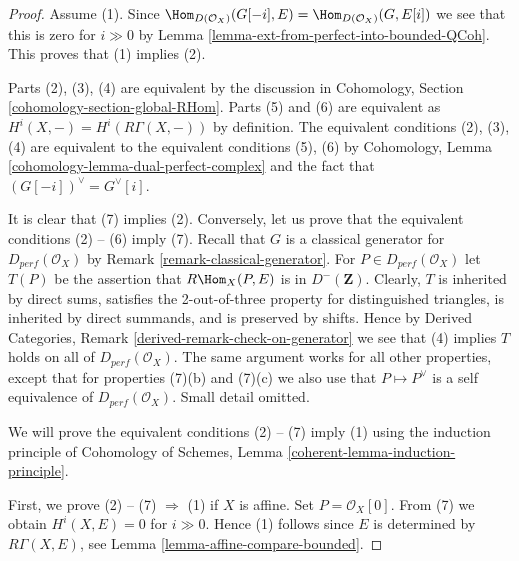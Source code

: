 \begin{proof}
Assume (1). Since
$\Hom_{D(\mathcal{O}_X)}(G[-i], E) = \Hom_{D(\mathcal{O}_X)}(G, E[i])$
we see that this is zero for $i \gg 0$ by
Lemma \ref{lemma-ext-from-perfect-into-bounded-QCoh}. This proves
that (1) implies (2).

\medskip\noindent
Parts (2), (3), (4) are equivalent by the discussion in
Cohomology, Section \ref{cohomology-section-global-RHom}.
Parts (5) and (6) are equivalent as $H^i(X, -) = H^i(R\Gamma(X, -))$
by definition. The equivalent conditions (2), (3), (4) are
equivalent to the equivalent conditions (5), (6) by
Cohomology, Lemma \ref{cohomology-lemma-dual-perfect-complex}
and the fact that $(G[-i])^\vee = G^\vee[i]$.

\medskip\noindent
It is clear that (7) implies (2). Conversely, 
let us prove that the equivalent conditions (2) -- (6) imply (7).
Recall that $G$ is a  classical generator for $D_{perf}(\mathcal{O}_X)$ by
Remark \ref{remark-classical-generator}.
For $P \in D_{perf}(\mathcal{O}_X)$ let $T(P)$ be the assertion that
$R\Hom_X(P, E)$ is in $D^-(\mathbf{Z})$.
Clearly, $T$ is inherited by direct sums,
satisfies the 2-out-of-three property for distinguished
triangles, is inherited by direct summands, and is preserved by shifts.
Hence by Derived Categories, Remark \ref{derived-remark-check-on-generator}
we see that (4) implies $T$ holds on all of $D_{perf}(\mathcal{O}_X)$.
The same argument works for all other properties, except that for properties
(7)(b) and (7)(c) we also use that $P \mapsto P^\vee$ is a self
equivalence of $D_{perf}(\mathcal{O}_X)$. Small detail omitted.

\medskip\noindent
We will prove the equivalent conditions (2) -- (7) imply (1)
using the induction principle of
Cohomology of Schemes, Lemma \ref{coherent-lemma-induction-principle}.

\medskip\noindent
First, we prove (2) -- (7) $\Rightarrow$ (1) if $X$ is affine.
Set $P = \mathcal{O}_X[0]$. From (7) we obtain $H^i (X, E) = 0$ for $i \gg 0$.
Hence (1) follows since $E$ is determined by $R\Gamma (X, E)$,
see Lemma \ref{lemma-affine-compare-bounded}.


\end{proof}
